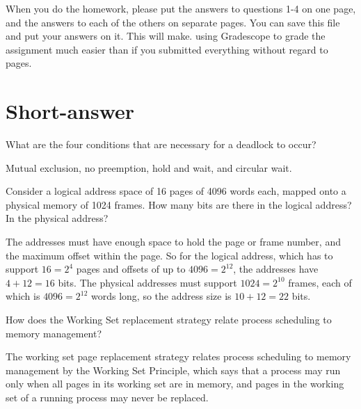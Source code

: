 \documentclass[ecs150,spring2022]{ucdclass3}
\begin{document}


\noindent When you do the homework, please put the answers to questions 1-4 on one page, and the answers to each of the others on separate pages. You can save this file and put your answers on it. This will make. using Gradescope to grade the assignment much easier than if you submitted everything without regard to pages.

\vspace{1em}

\noindent {}

\section*{Short-answer}

\begin{enumerate}

 What are the four conditions that are necessary for a deadlock to occur?

\begin{ansenv}
Mutual exclusion, no preemption, hold and wait, and circular wait.
\end{ansenv}

\vspace{1.8in}

 Consider a logical address space of 16 pages of 4096 words each, mapped onto a physical memory of 1024 frames. How many bits are there in the logical address? In the physical address?

\begin{ansenv}
The addresses must have enough space to hold the page or frame number, and the maximum offset within the page. So for the logical address, which has to support $16 = 2^4$ pages and offsets of up to $4096 = 2^{12}$, the addresses have $4 + 12 = 16$ bits. The physical addresses must support $1024 = 2^{10}$ frames, each of which is $4096 = 2^{12}$ words long, so the address size is $10 + 12 = 22$ bits.
\end{ansenv}

\vspace{1in}

 How does the Working Set replacement strategy relate process scheduling to memory management?

\begin{ansenv}
The working set page replacement strategy relates process scheduling to memory management by the Working Set Principle, which says that a process may run only when all pages in its working set are in memory, and pages in the working set of a running process may never be replaced.
\end{ansenv}

\end{enumerate}
\end{document}
